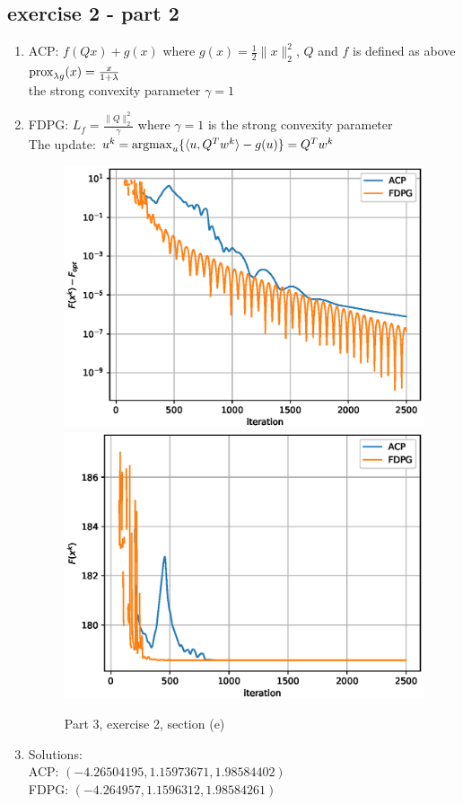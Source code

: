 \subsection{exercise 2 - part 2}
\begin{enumerate}
    \item ACP: $f(Qx) + g(x)$ where $g(x)=\frac{1}{2}\|x\|_2^2$, $Q$ and $f$ is defined as above\\
    $\operatorname{prox}_{\lambda g}(x) = \frac{x}{1+\lambda}$\\
    the strong convexity parameter $\gamma=1$

    \item FDPG: $L_f=\frac{\|Q\|_2^2}{\gamma}$ where $\gamma=1$ is the strong convexity parameter\\
    The update: $u^k = \operatorname*{arg max}_u \{\langle u, Q^T w^k \rangle - g(u)\} = Q^T w^k$
    \begin{figure}[ht]
        \centering
        \includegraphics[scale=0.5]{codes/result_images/ex_p3_e2_2_1_results.eps}
        \includegraphics[scale=0.5]{codes/result_images/ex_p3_e2_2_2_results.eps}
        \caption{Part 3, exercise 2, section (e)}
        \label{fig:p3e1_1}
    \end{figure}

    \item Solutions:\\
    ACP: $(-4.26504195, 1.15973671, 1.98584402)$\\
    FDPG: $(-4.264957, 1.1596312, 1.98584261)$
\end{enumerate}
